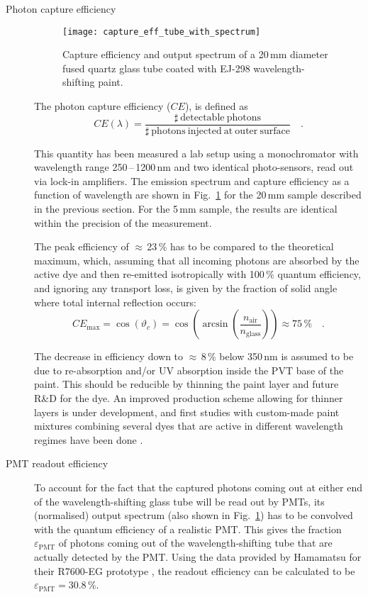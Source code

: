 \begin{description}

\item[Photon capture efficiency]
 \begin{figure}[t]
  \centering
   \texttt{[image: capture\_eff\_tube\_with\_spectrum]}
  \caption{Capture efficiency and output spectrum of a 20\,mm diameter fused 
    quartz glass tube coated with EJ-298 wavelength-shifting paint.}
  \label{fig:capture_eff}
 \end{figure}
The photon capture efficiency ($CE$), is defined as 
\begin{equation}
 CE(\lambda) = \frac{\mathrm{\sharp\ detectable\ photons}}
    {\mathrm{\sharp\ photons\ injected\ at\ outer\ surface}}\quad.
\end{equation}

This quantity has been measured a lab setup using a monochromator with 
wavelength range 250\,--\,1200\,nm and two identical photo-sensors, read out via 
lock-in amplifiers. The emission spectrum and capture efficiency as a function 
of wavelength are shown in Fig.~\ref{fig:capture_eff} for the 20\,mm sample 
described in the previous section. For the 5\,mm sample, the results are 
identical within the precision of the measurement.

The peak efficiency of $\approx$\,23\,\% has to be compared to the theoretical
maximum, which, assuming that all incoming photons are absorbed by the active 
dye and then re-emitted isotropically with 100\,\% quantum efficiency, and
ignoring any transport loss, is given by the fraction of solid angle where total 
internal reflection occurs:
\begin{equation}
 CE_{\mathrm{max}} = \cos(\vartheta_c) = 
\cos\left(\arcsin\left(\frac{n_\mathrm{air}}{n_\mathrm{glass}}\right)\right) 
\approx 75\,\%\quad.
\end{equation}

The decrease in efficiency down to $\approx$\,8\,\% below 350\,nm is assumed to
be due to re-absorption and/or UV absorption inside the PVT base of the paint. 
This should be reducible by thinning the paint layer and future R\&D for
the dye. An improved production scheme allowing for thinner layers is under 
development, and first studies with custom-made paint mixtures combining
several dyes that are active in different wavelength regimes have been done
\cite{DustinMaster}.

\item[PMT readout efficiency]
To account for the fact that the captured photons coming out at either end of 
the wavelength-shifting glass tube will be read out by PMTs, its (normalised) 
output spectrum (also shown in Fig.~\ref{fig:capture_eff}) has to be convolved
with the quantum efficiency of a realistic PMT. This gives the fraction 
$\varepsilon_\mathrm{PMT}$ of photons coming out of the wavelength-shifting tube 
that are actually detected by the PMT. Using the data provided by Hamamatsu for 
their R7600-EG prototype \cite{hamamatsu}, the readout efficiency can be 
calculated to be $\varepsilon_\mathrm{PMT} = 30.8\,\%$.


\end{description}
